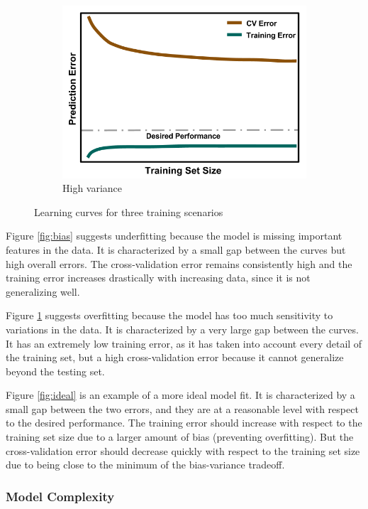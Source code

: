 \begin{figure}[!hp]
\begin{subfigure}[h]{0.65\linewidth}
    \includegraphics[width=\linewidth]{./chapters/litrev/LearningCurve-variance.png}
    \caption{High variance}
    \label{fig:variance}
  \end{subfigure}
  \caption{Learning curves for three training scenarios}
  \label{fig:learning}
\end{figure}

Figure \ref{fig:bias} suggests underfitting because the model is missing
important features in the data. It is characterized by a small gap between the
curves but high overall errors. The cross-validation error remains consistently
high and the training error increases drastically with increasing data, since
it is not generalizing well. 

Figure \ref{fig:variance} suggests overfitting because the model has too much
sensitivity to variations in the data. It is characterized by a very large gap
between the curves. It has an extremely low training error, as it has taken
into account every detail of the training set, but a high cross-validation
error because it cannot generalize beyond the testing set. 

Figure \ref{fig:ideal} is an example of a more ideal model fit. It is
characterized by a small gap between the two errors, and they are at a
reasonable level with respect to the desired performance.  The training error
should increase with respect to the training set size due to a larger amount of
bias (preventing overfitting). But the cross-validation error should decrease
quickly with respect to the training set size due to being close to the minimum
of the bias-variance tradeoff. 

\subsubsection{Model Complexity}

